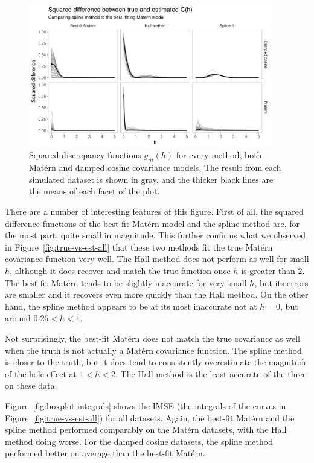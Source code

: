 \documentclass[12pt]{article}
\begin{document}
\begin{figure}[htbp]
  \centering
  \includegraphics[width=0.95\textwidth]{sqdiff.pdf}
  \caption{Squared discrepancy functions $g_m(h)$ for every method, both Mat\'{e}rn and damped cosine covariance models. The result from each simulated dataset is shown in gray, and the thicker black lines are the means of each facet of the plot.}
  \label{fig:sqdiff}
\end{figure}

There are a number of interesting features of this figure. First of all, the squared difference functions of the best-fit Mat\'{e}rn model and the spline method are, for the most part, quite small in magnitude. This further confirms what we observed in Figure~\ref{fig:true-vs-est-all} that these two methods fit the true Mat\'{e}rn covariance function very well. The Hall method does not perform as well for small $h$, although it does recover and match the true function once $h$ is greater than 2. The best-fit Mat\'{e}rn tends to be slightly inaccurate for very small $h$, but its errors are smaller and it recovers even more quickly than the Hall method. On the other hand, the spline method appears to be at its most inaccurate not at $h = 0$, but around $0.25 < h < 1$.

Not surprisingly, the best-fit Mat\'{e}rn does not match the true covariance as well when the truth is not actually a Mat\'{e}rn covariance function. The spline method is closer to the truth, but it does tend to consistently overestimate the magnitude of the hole effect at $1 < h < 2$. The Hall method is the least accurate of the three on these data.

Figure~\ref{fig:boxplot-integrals} shows the IMSE (the integrals of the curves in Figure~\ref{fig:true-vs-est-all}) for all datasets. Again, the best-fit Mat\'{e}rn and the spline method performed comparably on the Mat\'{e}rn datasets, with the Hall method doing worse. For the damped cosine datasets, the spline method performed better on average than the best-fit Mat\'{e}rn.
\end{document}
